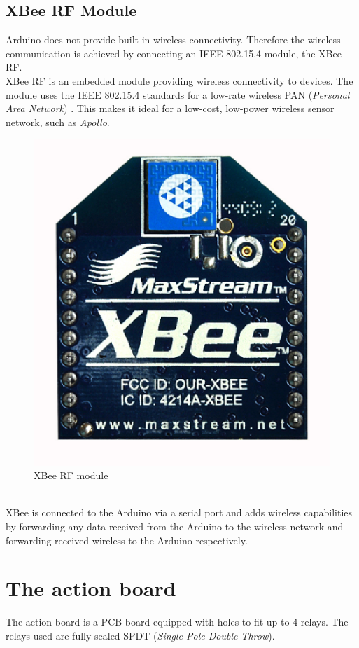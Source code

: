 \documentclass[12pt,a4paper,draft]{report}
\begin{document}
\subsection{XBee RF Module}
Arduino does not provide built-in wireless connectivity. Therefore the wireless communication is achieved by connecting an IEEE 802.15.4 module, the XBee RF.
\ \\
XBee RF is an embedded module providing wireless connectivity to devices. The module uses the IEEE 802.15.4 standards for a low-rate wireless PAN (\textit{Personal Area Network}) \cite{website:xbee}. This makes it ideal for a low-cost, low-power wireless sensor network, such as \emph{Apollo}.
\begin{figure}[H]
    \centering
    \includegraphics*[scale=0.4]{xbee}
    \caption{XBee RF module}
\end{figure}
\ \\
XBee is connected to the Arduino via a serial port and adds wireless capabilities by forwarding any data received from the Arduino to the wireless network and forwarding received wireless to the Arduino respectively.
%
\section{The action board}
The action board is a PCB board equipped with holes to fit up to 4 relays. The relays used are fully sealed SPDT (\textit{Single Pole Double Throw}). \\
\ \\
%
\end{document}

